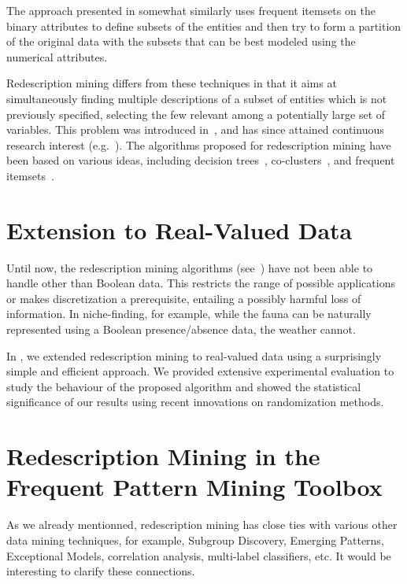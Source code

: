 \documentclass[a4paper,10pt]{article}
\begin{document}
The approach presented in \cite{garriga07crossmining} somewhat
similarly uses frequent itemsets on the binary attributes to define
subsets of the entities and then try to form a partition of the
original data with the subsets that can be best modeled using the
numerical attributes.

Redescription mining differs from these techniques in that it aims at
simultaneously finding multiple descriptions of a subset of entities
which is not previously specified, selecting the few relevant among a
potentially large set of variables.  This problem was introduced
in~\cite{ramakrishnan04turning}, and has since attained continuous
research interest
(e.g.~\cite{parida05redescription,zaki05reasoning,gallo08finding,kumar07redescription}).
The algorithms proposed for redescription mining have been based on
various ideas, including decision trees~\cite{ramakrishnan04turning},
co-clusters~\cite{parida05redescription}, and frequent
itemsets~\cite{gallo08finding}.


\section{Extension to Real-Valued Data}
Until now, the redescription mining algorithms
(see~\cite{gallo08finding,parida05redescription,ramakrishnan04turning,zaki05reasoning})
have not been able to handle other than Boolean data.  This restricts
the range of possible applications or makes discretization a
prerequisite, entailing a possibly harmful loss of information. In
niche-finding, for example, while the fauna can be naturally
represented using a Boolean presence/absence data, the weather cannot.

In \cite{galbrun11from}, we extended redescription mining to
real-valued data using a surprisingly simple and efficient
approach. We provided extensive experimental evaluation to study the
behaviour of the proposed algorithm and showed the statistical
significance of our results using recent innovations on randomization
methods.

\section{Redescription Mining in the Frequent Pattern Mining Toolbox}
As we already mentionned, redescription mining has close ties with
various other data mining techniques, for example, Subgroup Discovery,
Emerging Patterns, Exceptional Models, correlation analysis,
multi-label classifiers, etc. It would be interesting to clarify these
connections.
\end{document}
